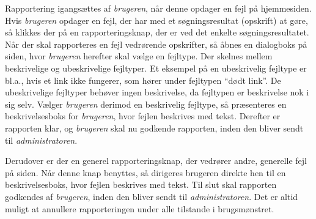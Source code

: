 {Rapportering igangsættes af \textit{brugeren}, når denne opdager en fejl på hjemmesiden. Hvis \textit{brugeren} opdager en fejl, der har med et søgningsresultat (opskrift) at gøre, så klikkes der på en rapporteringsknap, der er ved det enkelte søgningsresultatet. Når der skal rapporteres en fejl vedrørende opskrifter, så åbnes en dialogboks på siden, hvor \textit{brugeren} herefter skal vælge en fejltype. Der skelnes mellem beskrivelige og ubeskrivelige fejltyper. Et eksempel på en ubeskrivelig fejltype er bl.a., hvis et link ikke fungerer, som hører under fejltypen “dødt link”. De ubeskrivelige fejltyper behøver ingen beskrivelse, da fejltypen er beskrivelse nok i sig selv. Vælger \textit{brugeren} derimod en beskrivelig fejltype, så præsenteres en beskrivelsesboks for \textit{brugeren}, hvor fejlen beskrives med tekst. Derefter er rapporten klar, og \textit{brugeren} skal nu godkende rapporten, inden den bliver sendt til \textit{administratoren}.

Derudover er der en generel rapporteringsknap, der vedrører andre, generelle fejl på siden. Når denne knap benyttes, så dirigeres brugeren direkte hen til en beskrivelsesboks, hvor fejlen beskrives med tekst. Til slut skal rapporten godkendes af \textit{brugeren}, inden den bliver sendt til \textit{administratoren}. Det er altid muligt at annullere rapporteringen under alle tilstande i brugsmønstret.}
{}
{}

